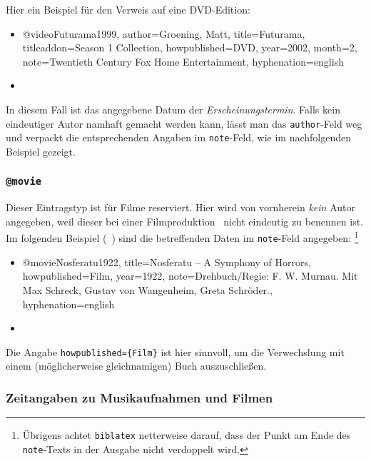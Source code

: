 \noindent
Hier ein Beispiel für den Verweis auf eine DVD-Edition:
%
\begin{itemize}
\item[] 
\begin{GenericCode}[numbers=none]
@video{Futurama1999,
  author={Groening, Matt},
  title={Futurama},
  titleaddon={Season 1 Collection},
  howpublished={DVD},
  year={2002},
  month={2},
  note={Twentieth Century Fox Home Entertainment},
  hyphenation={english}
 }
\end{GenericCode}
\item[\cite{Futurama1999}] 
\end{itemize}
%
In diesem Fall ist das angegebene Datum der \emph{Erscheinungstermin}. 
Falls kein eindeutiger Autor namhaft gemacht werden kann, lässt man das
\texttt{author}-Feld weg und verpackt die entsprechenden Angaben im \texttt{note}-Feld, wie im nachfolgenden Beispiel gezeigt.




\subsubsection{\texttt{@movie}}
\label{sec:@movie}
Dieser Eintragstyp ist für Filme reserviert. 
Hier wird von vornherein \emph{kein} Autor angegeben, weil dieser bei 
einer Filmproduktion \ia\ nicht eindeutig zu benennen ist. 
Im folgenden Beispiel (\sa\ \cite{Psycho1960}) sind die betreffenden Daten 
im \texttt{note}-Feld angegeben:%
\footnote{Übrigens achtet \texttt{biblatex} netterweise darauf, dass der  
Punkt am Ende des \texttt{note}-Texts in der Ausgabe nicht verdoppelt wird.}
%
\begin{itemize}
\item[] 
\begin{GenericCode}[numbers=none]
@movie{Nosferatu1922,
  title={Nosferatu -- A Symphony of Horrors},
  howpublished={Film},
  year={1922},
  note={Drehbuch/Regie: F. W. Murnau. Mit Max Schreck, Gustav von Wangenheim, Greta Schröder.},
  hyphenation={english}
}
\end{GenericCode}
\item[\cite{Nosferatu1922}] 
\end{itemize}
%
Die Angabe \verb!howpublished={Film}! ist hier sinnvoll, um die Verwechslung
mit einem (möglicherweise gleichnamigen) Buch auszuschließen.



\subsubsection{Zeitangaben zu Musikaufnahmen und Filmen} 

